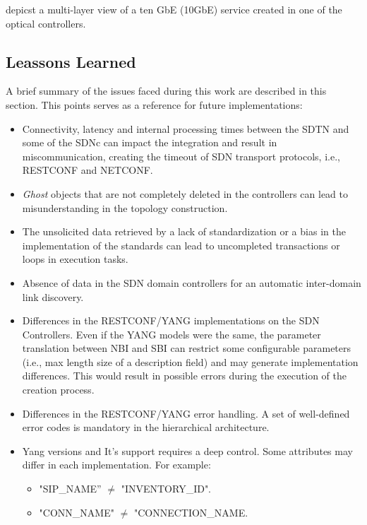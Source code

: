\documentclass[a4paper,fleqn]{cas-dc}
\begin{document}
 depicst a multi-layer view of a ten GbE (10GbE) service created in one of the optical controllers.


\subsection{Leassons Learned}

A brief summary of the issues faced during this work are described in this section. This points serves as a reference for future implementations: 

\begin{itemize}
    \item Connectivity, latency and internal processing times between the SDTN and some of the SDNc can impact the integration and result in miscommunication, creating the timeout of SDN transport protocols, i.e., RESTCONF and NETCONF.  
    \item \textit{Ghost} objects that are not completely deleted in the controllers can lead to misunderstanding in the topology construction. 
    \item The unsolicited data retrieved by a lack of standardization or a bias in the implementation of the standards can lead to uncompleted transactions or loops in execution tasks.
    \item Absence of data in the SDN domain controllers for an automatic inter-domain link discovery.
    \item Differences in the RESTCONF/YANG implementations on the SDN Controllers. Even if the YANG models were the same, the parameter translation between NBI and SBI can restrict some configurable parameters (i.e., max length size of a description field) and may generate implementation differences. This would result in possible errors during the execution of the creation process.
    \item Differences in the RESTCONF/YANG error handling. A set of well-defined error codes is mandatory in the hierarchical architecture.
    \item Yang versions and It's support requires a deep control. Some attributes may differ in each implementation. For example:
        \begin{itemize}
            \item "SIP\_NAME” $\neq$ "INVENTORY\_ID". 
            \item "CONN\_NAME" $\neq$ "CONNECTION\_NAME. 
        \end{itemize}
\end{itemize}
\end{document}

